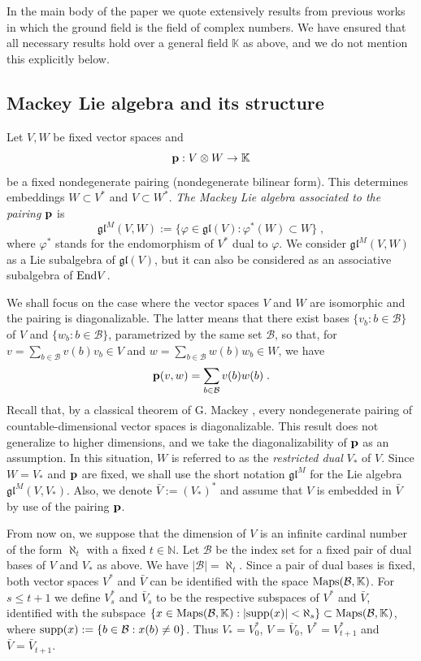 \documentclass[12pt]{article}
\def\KK {{\mathbb K}}     %
\def\NN {{\mathbb N}}     %
\def\B  {\mathcal B}
\def\mk {\mathfrak}
\begin{document}
In the main body of the paper we quote extensively results from previous works in which the ground field is the field of complex numbers. We have ensured that all necessary results hold over a general field $\KK$ as above, and we do not mention this explicitly below.


\subsection{Mackey Lie algebra and its structure}

Let $V,W$ be fixed vector spaces and
$$
{\bf p}:V\otimes W \to \KK
$$
be a fixed nondegenerate pairing (nondegenerate bilinear form). This determines embeddings $W\subset V^*$ and $V\subset W^*$. {\it The Mackey Lie algebra associated to the pairing} ${\bf p}$ is
$$
\mk{gl}^M(V,W):=\{\varphi\in\mk{gl}(V): \varphi^*(W)\subset W \} \;,
$$
where $\varphi^*$ stands for the endomorphism of $V^*$ dual to $\varphi$. We consider $\mk{gl}^M(V,W)$ as a Lie subalgebra of $\mk{gl}(V)$, but it can also be considered as an associative subalgebra of ${\rm End}V$.

We shall focus on the case where the vector spaces $V$ and $W$ are isomorphic and the pairing is diagonalizable. The latter means that there exist bases $\{v_b:b\in \B\}$ of $V$ and $\{w_b:b\in\B\}$, parametrized by the same set $\B$, so that, for $v=\sum\limits_{b\in\B} v(b)v_b\in V$ and $w=\sum\limits_{b\in\B} w(b)w_b\in W$, we have
$$
{\bf p}(v,w) = \sum\limits_{b\in\B} v(b)w(b) \;.
$$
Recall that, by a classical theorem of G. Mackey \cite{Mackey}, every nondegenerate pairing of countable-dimensional vector spaces is diagonalizable. This result does not generalize to higher dimensions, and we take the diagonalizability of ${\bf p}$ as an assumption. In this situation, $W$ is referred to as the {\it restricted dual} $V_*$ of $V$. Since $W=V_*$ and ${\bf p}$ are fixed, we shall use the short notation $\mk{gl}^M$ for the Lie algebra $\mk{gl}^M(V,V_*)$. Also, we denote $\bar V:=(V_*)^*$ and assume that $V$ is embedded in $\bar V$ by use of the pairing ${\bf p}$. 

From now on, we suppose that the dimension of $V$ is an infinite cardinal number of the form $\aleph_{t}$ with a fixed $t\in\NN$. Let $\B$ be the index set for a fixed pair of dual bases of $V$ and $V_*$ as above. We have $|\B|=\aleph_t$. Since a pair of dual bases is fixed, both vector spaces $V^*$ and $\bar V$ can be identified with the space ${\rm Maps}(\B,\KK)$. For $s\leq t+1$ we define $V^*_{s}$ and $\bar V_{s}$ to be the respective subspaces of $V^*$ and $\bar V$, identified with the subspace $\{x\in {\rm Maps}(\B,\KK):|{\rm supp}(x)|<\aleph_{s}\}\subset {\rm Maps}(\B,\KK)$, where ${\rm supp}(x):=\{b\in\B:x(b)\ne0\}$. Thus $V_*=V^*_{0}$, $V=\bar V_{0}$, $V^*=V^*_{t+1}$ and $\bar V=\bar V_{t+1}$.
\end{document}
